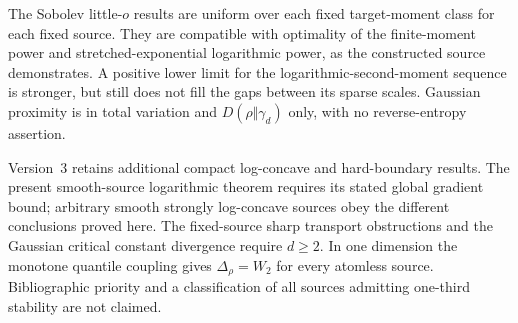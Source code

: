 \documentclass[11pt]{article}
\numberwithin{equation}{section}
\theoremstyle{remark}\newtheorem{remark}[theorem]{Remark}
\begin{document}
The Sobolev little-$o$ results are uniform over each fixed target-moment class for each fixed source. They are compatible with optimality of the finite-moment power and stretched-exponential logarithmic power, as the constructed source demonstrates. A positive lower limit for the logarithmic-second-moment sequence is stronger, but still does not fill the gaps between its sparse scales. Gaussian proximity is in total variation and $D(\rho\Vert\gamma_d)$ only, with no reverse-entropy assertion.

Version~3 \cite{ManuscriptV3} retains additional compact log-concave and hard-boundary results. The present smooth-source logarithmic theorem requires its stated global gradient bound; arbitrary smooth strongly log-concave sources obey the different conclusions proved here. The fixed-source sharp transport obstructions and the Gaussian critical constant divergence require $d\ge2$. In one dimension the monotone quantile coupling gives $\Delta_\rho=W_2$ for every atomless source. Bibliographic priority and a classification of all sources admitting one-third stability are not claimed.

\clearpage
\begingroup\raggedright


\endgroup
\end{document}
